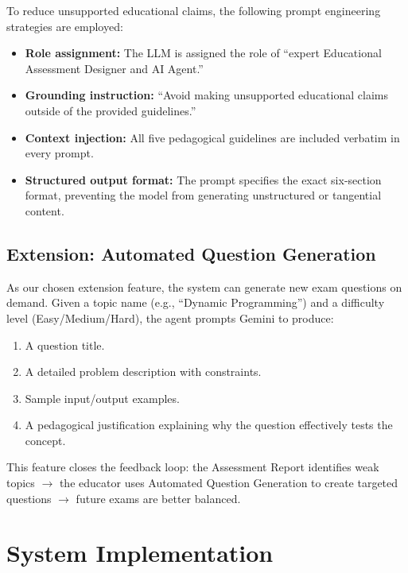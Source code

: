\documentclass[12pt, a4paper]{article}
\begin{document}
To reduce unsupported educational claims, the following prompt engineering strategies are employed:

\begin{itemize}
    \item \textbf{Role assignment:} The LLM is assigned the role of ``expert Educational Assessment Designer and AI Agent.''
    \item \textbf{Grounding instruction:} ``Avoid making unsupported educational claims outside of the provided guidelines.''
    \item \textbf{Context injection:} All five pedagogical guidelines are included verbatim in every prompt.
    \item \textbf{Structured output format:} The prompt specifies the exact six-section format, preventing the model from generating unstructured or tangential content.
\end{itemize}

\subsection{Extension: Automated Question Generation}

As our chosen extension feature, the system can generate new exam questions on demand. Given a topic name (e.g., ``Dynamic Programming'') and a difficulty level (Easy/Medium/Hard), the agent prompts Gemini to produce:

\begin{enumerate}[noitemsep]
    \item A question title.
    \item A detailed problem description with constraints.
    \item Sample input/output examples.
    \item A pedagogical justification explaining why the question effectively tests the concept.
\end{enumerate}

This feature closes the feedback loop: the Assessment Report identifies weak topics $\rightarrow$ the educator uses Automated Question Generation to create targeted questions $\rightarrow$ future exams are better balanced.

\section{System Implementation}
\label{sec:implementation}
\end{document}

